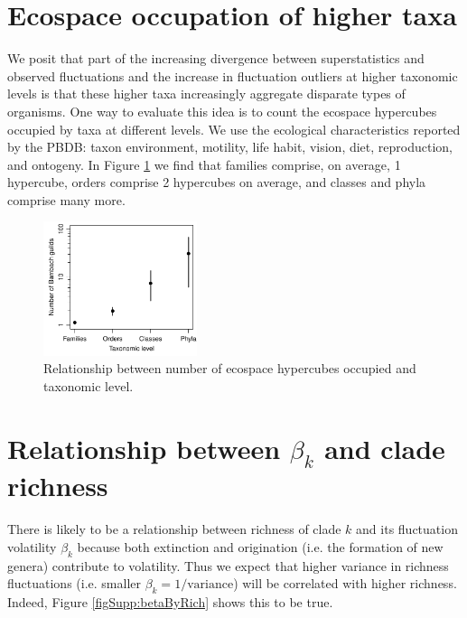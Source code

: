 \documentclass[12pt]{article}
\let\citep=\cite
\begin{document}
\section{Ecospace occupation of higher taxa}
\label{sec:suppGuilds} 

We posit that part of the increasing divergence between
superstatistics and observed fluctuations and the increase in
fluctuation outliers at higher taxonomic levels is that these higher
taxa increasingly aggregate disparate types of organisms. One way to
evaluate this idea is to count the ecospace hypercubes
\citep{bambach1983, bambach2007, bush2007} occupied by taxa at
different levels. We use the ecological characteristics reported by
the PBDB: taxon environment, motility, life habit, vision, diet,
reproduction, and ontogeny. In Figure \ref{figSupp:eeSpaceOcc} we find
that families comprise, on average, 1 hypercube, orders comprise 2
hypercubes on average, and classes and phyla comprise many more.

\begin{figure}[!hp]
  \centering
  \includegraphics[width=0.4\textwidth]{../../figSupp_eeSpaceOcc.pdf} 
  \caption{Relationship between number of ecospace hypercubes occupied
    and taxonomic level.}
  \label{figSupp:eeSpaceOcc}
\end{figure}


\section{Relationship between $\beta_k$ and clade richness}
\label{sec:suppBetaRichness} 

There is likely to be a relationship between richness of clade $k$ and
its fluctuation volatility $\beta_k$ because both extinction and
origination (i.e. the formation of new genera) contribute to
volatility. Thus we expect that higher variance in richness
fluctuations (i.e. smaller $\beta_k = 1/\text{variance}$) will be
correlated with higher richness.  Indeed, Figure
\ref{figSupp:betaByRich} shows this to be true. 
\end{document}

